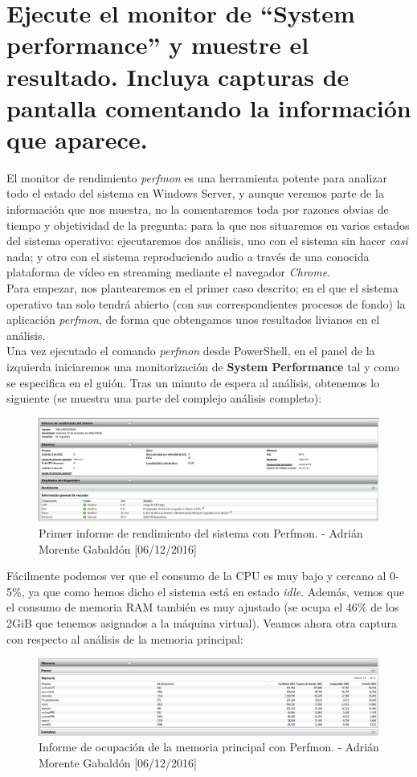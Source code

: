 \section{Ejecute el monitor de ``System performance'' y muestre el resultado. Incluya capturas de pantalla comentando la información que aparece.}
El monitor de rendimiento \emph{perfmon} es una herramienta potente para analizar todo el estado del sistema en Windows Server, y aunque veremos parte de la información que nos muestra, no la comentaremos toda por razones obvias de tiempo y objetividad de la pregunta; para la que nos situaremos en varios estados del sistema operativo: ejecutaremos dos análisis, uno con el sistema sin hacer \textit{casi} nada; y otro con el sistema reproduciendo audio a través de una conocida plataforma de vídeo en streaming mediante el navegador \emph{Chrome}. \\
Para empezar, nos plantearemos en el primer caso descrito; en el que el sistema operativo tan solo tendrá abierto (con sus correspondientes procesos de fondo) la aplicación \emph{perfmon}, de forma que obtengamos unos resultados livianos en el análisis. \\ Una vez ejecutado el comando \emph{perfmon} desde PowerShell, en el panel de la izquierda iniciaremos una monitorización de \textbf{System Performance} tal y como se especifica en el guión. Tras un minuto de espera al análisis, obtenemos lo siguiente (se muestra una parte del complejo análisis completo):
\begin{figure}[H]
	\centering
	\includegraphics[scale=0.6]{perfmon-1}
	\caption{Primer informe de rendimiento del sistema con Perfmon. - Adrián Morente Gabaldón [06/12/2016]}
	\label{figura9}
\end{figure}
Fácilmente podemos ver que el consumo de la CPU es muy bajo y cercano al 0-5\%, ya que como hemos dicho el sistema está en estado \emph{idle}. Además, vemos que el consumo de memoria RAM también es muy ajustado (se ocupa el 46\% de los 2GiB que tenemos asignados a la máquina virtual). Veamos ahora otra captura con respecto al análisis de la memoria principal:
\begin{figure}[H]
	\centering
	\includegraphics[scale=0.35]{perfmon-2}
	\caption{Informe de ocupación de la memoria principal con Perfmon. - Adrián Morente Gabaldón [06/12/2016]}
	\label{figura10}
\end{figure}
